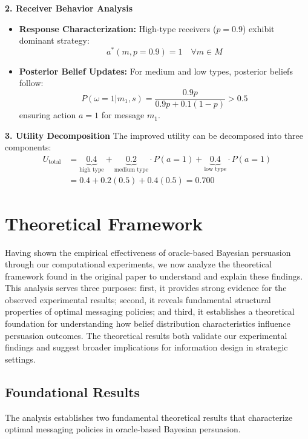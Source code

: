 \documentclass[12pt]{article}
\theoremstyle{plain}
\theoremstyle{definition}
\theoremstyle{remark}
\begin{document}
\textbf{2. Receiver Behavior Analysis}
\begin{itemize}
    \item \textbf{Response Characterization:} High-type receivers ($p=0.9$) exhibit dominant strategy:
    \begin{equation}
        a^*(m,p=0.9) = 1 \quad \forall m \in M
    \end{equation}
    
    \item \textbf{Posterior Belief Updates:} For medium and low types, posterior beliefs follow:
    \begin{equation}
        P(\omega=1|m_1,s) = \frac{0.9p}{0.9p + 0.1(1-p)} > 0.5
    \end{equation}
    ensuring action $a=1$ for message $m_1$.
\end{itemize}

\textbf{3. Utility Decomposition}
The improved utility can be decomposed into three components:
\begin{align*}
    U_{\text{total}} &= \underbrace{0.4}_{\text{high type}} + \underbrace{0.2}_{\text{medium type}} \cdot P(a=1) + \underbrace{0.4}_{\text{low type}} \cdot P(a=1) \\
    &= 0.4 + 0.2(0.5) + 0.4(0.5) = 0.700
\end{align*}

\section{Theoretical Framework}

Having shown the empirical effectiveness of oracle-based Bayesian persuasion through our computational experiments, we now analyze the theoretical framework found in the original paper to understand and explain these findings. This analysis serves three purposes: first, it provides strong evidence for the observed experimental results; second, it reveals fundamental structural properties of optimal messaging policies; and third, it establishes a theoretical foundation for understanding how belief distribution characteristics influence persuasion outcomes. The theoretical results both validate our experimental findings and suggest broader implications for information design in strategic settings.

\subsection{Foundational Results}
The analysis establishes two fundamental theoretical results that characterize optimal messaging policies in oracle-based Bayesian persuasion.
\end{document}
